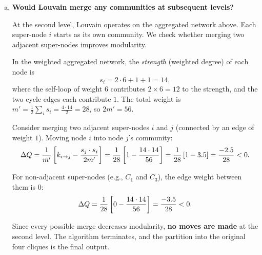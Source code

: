 \documentclass{article}
\begin{document}
\begin{tcolorbox}[colback=white, colframe=black!70, title=\textbf{Solution to Exercise 1}, breakable]
\begin{enumerate}[(a)]
\begin{center}
\end{center}

The aggregated network is a weighted cycle $C_4$ on four super-nodes, where each node has a self-loop of weight $6$ and each edge in the cycle has weight $1$.

\item \textbf{Would Louvain merge any communities at subsequent levels?}

At the second level, Louvain operates on the aggregated network above. Each super-node $i$ starts as its own community. We check whether merging two adjacent super-nodes improves modularity.

In the weighted aggregated network, the \emph{strength} (weighted degree) of each node is
\[
s_i = 2\cdot 6 + 1 + 1 = 14,
\]
where the self-loop of weight $6$ contributes $2\times 6 = 12$ to the strength, and the two cycle edges each contribute $1$. The total weight is $m' = \frac{1}{2}\sum_i s_i = \frac{4\cdot 14}{2}= 28$, so $2m' = 56$.

Consider merging two adjacent super-nodes $i$ and $j$ (connected by an edge of weight $1$). Moving node $i$ into node $j$'s community:
\[
\Delta Q = \frac{1}{m'}\left[k_{i\to j} - \frac{s_j\cdot s_i}{2m'}\right] = \frac{1}{28}\left[1 - \frac{14\cdot 14}{56}\right] = \frac{1}{28}\left[1 - 3.5\right] = \frac{-2.5}{28} < 0.
\]

For non-adjacent super-nodes (e.g., $C_1$ and $C_3$), the edge weight between them is $0$:
\[
\Delta Q = \frac{1}{28}\left[0 - \frac{14\cdot 14}{56}\right] = \frac{-3.5}{28} < 0.
\]

Since every possible merge decreases modularity, \textbf{no moves are made} at the second level. The algorithm terminates, and the partition into the original four cliques is the final output.


\end{enumerate}
\end{tcolorbox}
\end{document}
